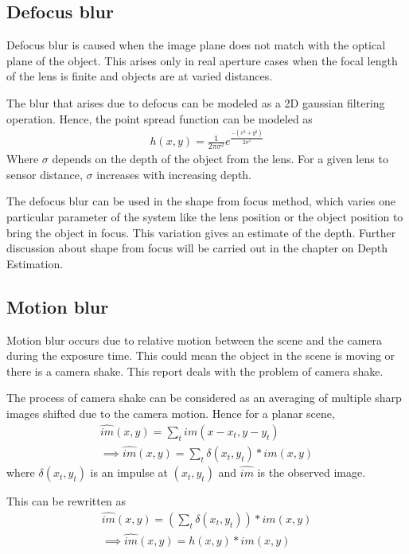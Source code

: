 \documentclass[BTech]{iitmdiss}
\begin{document}
\subsection{Defocus blur}
\label{basic_theory:image_blur:optical}
Defocus blur is caused when the image plane does not match with the 
optical plane of the object. This arises only in real aperture cases
when the focal length of the lens is finite and objects are at varied
distances. 

The blur that arises due to defocus can be modeled as a 2D gaussian
filtering operation. Hence, the point spread function can be modeled as
\begin{align*}
h(x,y) = \frac{1}{2\pi\sigma^2}e^\frac{-(x^2+y^2)}{2\sigma^2}
\end{align*}
Where $\sigma$ depends on the depth of the object from the lens. For a 
given lens to sensor distance, $\sigma$ increases with increasing depth.

The defocus blur can be used in the shape from focus method, which 
varies one particular parameter of the system like the lens position or
the object position to bring the object in focus. This variation gives 
an estimate of the depth. Further discussion about shape from focus will
be carried out in the chapter on Depth Estimation.

\subsection{Motion blur}
\label{basic_theory:image_blur:motion}
Motion blur occurs due to relative motion between the scene and the 
camera during the exposure time. This could mean the object in the scene
is moving or there is a camera shake. This report deals with the problem
of camera shake.

The process of camera shake can be considered as an averaging of 
multiple sharp images shifted due to the camera motion. Hence for a 
planar scene, 
\begin{align*}
\hat{im}(x,y) = \sum_tim(x-x_t,y-y_t)\\
\implies\hat{im}(x,y) = \sum_t\delta(x_t, y_t)*im(x,y)
\end{align*}
where $\delta(x_t, y_t)$ is an impulse at $(x_t, y_t)$ and $\hat{im}$ is
the observed image.

This can be rewritten as
\begin{align*}
\hat{im}(x,y) = (\sum_t\delta(x_t, y_t))*im(x,y)\\
\implies \hat{im}(x,y) = h(x,y)*im(x,y)
\end{align*}
\end{document}
